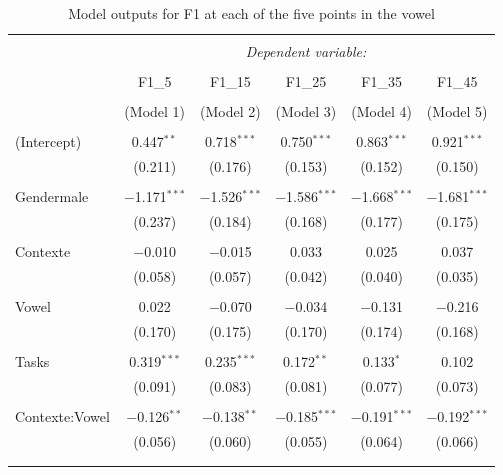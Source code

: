 \documentclass[charis,linguex]{glossa}
\newcommand{\nt}[1]{\textipa{[#1]}} %
\begin{document}
\begin{table}[htbp] \centering 
	\caption{Model outputs for F1 at each of the five points in the vowel} 
	\label{table_f1_fixed_effects} 
	\begin{tabular}{@{\extracolsep{5pt}}lccccc} 
		\\[-1.8ex]\hline 
		\hline \\[-1.8ex] 
		& \multicolumn{5}{c}{\textit{Dependent variable:}} \\ 
		\cline{2-6} 
		\\[-1.8ex] & F1\_5 & F1\_15 & F1\_25 & F1\_35 & F1\_45 \\ 
		\\[-1.8ex] & (Model 1) & (Model 2) & (Model 3) & (Model 4) & (Model 5)\\ 
		\hline \\[-1.8ex] 
		(Intercept) & 0.447$^{**}$ & 0.718$^{***}$ & 0.750$^{***}$ & 0.863$^{***}$ & 0.921$^{***}$ \\ 
		& (0.211) & (0.176) & (0.153) & (0.152) & (0.150) \\ 
		& & & & & \\ 
		Gendermale & $-$1.171$^{***}$ & $-$1.526$^{***}$ & $-$1.586$^{***}$ & $-$1.668$^{***}$ & $-$1.681$^{***}$ \\ 
		& (0.237) & (0.184) & (0.168) & (0.177) & (0.175) \\ 
		& & & & & \\ 
		Contexte & $-$0.010 & $-$0.015 & 0.033 & 0.025 & 0.037 \\ 
		& (0.058) & (0.057) & (0.042) & (0.040) & (0.035) \\ 
		& & & & & \\ 
		Vowel\nt{2} & 0.022 & $-$0.070 & $-$0.034 & $-$0.131 & $-$0.216 \\ 
		& (0.170) & (0.175) & (0.170) & (0.174) & (0.168) \\ 
		& & & & & \\ 
		Tasks & 0.319$^{***}$ & 0.235$^{***}$ & 0.172$^{**}$ & 0.133$^{*}$ & 0.102 \\ 
		& (0.091) & (0.083) & (0.081) & (0.077) & (0.073) \\ 
		& & & & & \\ 
		Contexte:Vowel\nt{2} & $-$0.126$^{**}$ & $-$0.138$^{**}$ & $-$0.185$^{***}$ & $-$0.191$^{***}$ & $-$0.192$^{***}$ \\ 
		& (0.056) & (0.060) & (0.055) & (0.064) & (0.066) \\ 
		& & & & & \\ 
		\hline \\[-1.8ex] 

\end{tabular}
\end{table}
\end{document}
